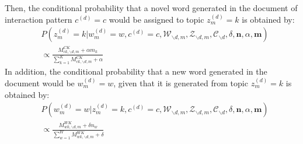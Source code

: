 \documentclass[a4paper]{article}
\begin{document}
Then, the conditional probability that a novel word generated in the document of interaction pattern $c^{(d)}=c$  would be assigned to topic $z_m^{(d)}=k$ is obtained by:
 \begin{equation}
 \begin{aligned}
 &P(z^{(d)}_m=k|w^{(d)}_m=w, c^{(d)}=c, \mathcal{W}_{\backslash d, m}, \mathcal{Z}_{\backslash d,m}, \mathcal{C}_{\backslash d}, \delta, \boldsymbol{n}, \alpha, \boldsymbol{m}) \\& \propto
 \frac{M^{CK}_{ck, \backslash d, m}+\alpha m_k}{\sum_{k=1}^KM^{CK}_{ck, \backslash d, m}+\alpha}
 \end{aligned}
 \end{equation}
In addition, the conditional probability that a new word generated in the document would be $w_m^{(d)}=w$, given that it is generated from topic $z_m^{(d)}=k$ is obtained by:
\begin{equation}
\begin{aligned}
& P(w^{(d)}_m=w|z^{(d)}_m=k, c^{(d)}=c, \mathcal{W}_{\backslash d, m}, \mathcal{Z}_{\backslash d,m}, \mathcal{C}_{\backslash d}, \delta, \boldsymbol{n}, \alpha, \boldsymbol{m}) \\& \propto 
\frac{M_{wk, \backslash d, m}^{WK}+\delta n_w}{\sum_{w=1}^WM_{wk, \backslash d, m}^{WK}+\delta}
\end{aligned} 
 \end{equation}


\end{document}
